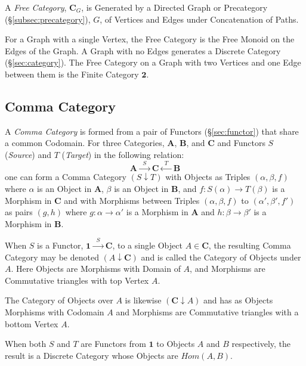 A \emph{Free Category}, $\mathbf{C}_G$, is Generated by a Directed
Graph or Precategory (\S\ref{subsec:precategory}), $G$, of Vertices
and Edges under Concatenation of Paths.

For a Graph with a single Vertex, the Free Category is the Free Monoid
on the Edges of the Graph. A Graph with no Edges generates a Discrete
Category (\S\ref{sec:category}). The Free Category on a Graph with
two Vertices and one Edge between them is the Finite Category
$\mathbf{2}$.



\subsection{Comma Category}\label{subsec:comma_category}

A \emph{Comma Category} is formed from a pair of Functors
(\S\ref{sec:functor}) that share a common Codomain. For three
Categories, $\mathbf{A}$, $\mathbf{B}$, and $\mathbf{C}$ and Functors
$S$ (\emph{Source}) and $T$ (\emph{Target}) in the following relation:
\[
    \mathbf{A} \xrightarrow{\;\; S\;\;} \mathbf{C} \xleftarrow{\;\;
      T\;\;} \mathbf{B}
\]
one can form a Comma Category $(S \downarrow T)$ with Objects as
Triples $(\alpha, \beta, f)$ where $\alpha$ is an Object in
$\mathbf{A}$, $\beta$ is an Object in $\mathbf{B}$, and $f : S(\alpha)
\rightarrow T(\beta)$ is a Morphism in $\mathbf{C}$ and with Morphisms
between Triples $(\alpha, \beta, f)$ to $(\alpha', \beta', f')$ as
pairs $(g,h)$ where $g : \alpha \rightarrow \alpha'$ is a Morphism in
$\mathbf{A}$ and $h : \beta \rightarrow \beta'$ is a Morphism in
$\mathbf{B}$.

When $S$ is a Functor, $\mathbf{1} \xrightarrow{\;\;S\;\;}
\mathbf{C}$, to a single Object $A \in \mathbf{C}$, the resulting
Comma Category may be denoted $(A \downarrow \mathbf{C})$ and is
called the Category of Objects under $A$. Here Objects are Morphisms
with Domain of $A$, and Morphisms are Commutative triangles with top
Vertex $A$.

The Category of Objects over $A$ is likewise $(\mathbf{C} \downarrow
A)$ and has as Objects Morphisms with Codomain $A$ and Morphisms are
Commutative triangles with a bottom Vertex $A$.

When both $S$ and $T$ are Functors from $\mathbf{1}$ to Objects $A$
and $B$ respectively, the result is a Discrete Category whose Objects
are $Hom(A,B)$.

